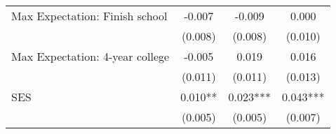 {\begin{tabular}{lccc}
\hspace{3mm}Max Expectation: Finish school&      -0.007   &      -0.009   &       0.000   \\
                    &     (0.008)   &     (0.008)   &     (0.010)   \\
 
\hspace{3mm}Max Expectation: 4-year college&      -0.005   &       0.019   &       0.016   \\
                    &     (0.011)   &     (0.011)   &     (0.013)   \\
 
\hspace{3mm}SES     &       0.010** &       0.023***&       0.043***\\
                    &     (0.005)   &     (0.005)   &     (0.007)   \\
 

\bottomrule
\end{tabular}
}

